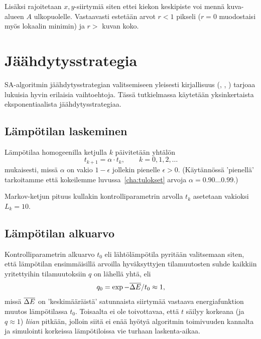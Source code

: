 Lisäksi rajoitetaan $x,y$-siirtymiä siten ettei kiekon keskipiste voi mennä kuva-alueen $A$ ulkopuolelle.
Vastaavasti estetään arvot $r < 1$ pikseli ($r = 0$ muodostaisi myös lokaalin minimin) ja $r >$ kuvan koko.


\section{Jäähdytysstrategia}
\label{sec:jaahdytysstrategia}


SA-algoritmin jäähdytysstrategian valitsemiseen yleisesti kirjallisuus (\cite{laarhoven}, \cite{salamonetal}, \cite{recipes07}) tarjoaa lukuisia hyvin erilaisia vaihtoehtoja.
Tässä tutkielmassa käytetään yksinkertaista eksponentiaalista jäähdytysstrategiaa.

\subsection{Lämpötilan laskeminen}
\label{sub:lampotilan_laskeminen}

Lämpötilaa homogeenilla ketjulla $k$ päivitetään yhtälön
\begin{equation}
    t_{k+1} = \alpha \cdot t_k, \qquad k = 0, 1, 2, \dots
\end{equation}
mukaisesti,
missä $\alpha$ on vakio $1 - \epsilon$ jollekin pienelle $\epsilon >0$.
(Käytännössä 'pienellä' tarkoitamme että kokeilemme luvussa~\ref{cha:tulokset} arvoja $\alpha = 0.90 \dots 0.99$.)

Markov-ketjun pituus kullakin kontrolliparametrin arvolla $t_k$ asetetaan vakioksi $L_k = 10$.


\subsection{Lämpötilan alkuarvo}
\label{sub:lampotilan_alkuarvo}

Kontrolliparametrin alkuarvo $t_0$ eli lähtölämpötila pyritään valitsemaan siten,
että lämpötilan ensimmäisillä arvoilla hyväksyttyjen tilamuutosten suhde kaikkiin yritettyihin  tilamuutoksiin  $q$ on lähellä yhtä, eli
\begin{equation}
    \label{eq:ratio}
    q_0 = \exp{-\overline{\Delta E} / t_0} \approx 1,
\end{equation}
missä $\overline{\Delta E}$ on 'keskimääräistä' satunnaista siirtymää vastaava energiafunktion muutos lämpötilassa $t_0$.
Toisaalta ei ole toivottavaa, että $t$ säilyy korkeana (ja $q \approx 1$) \emph{liian} pitkään, jolloin siitä ei enää hyötyä algoritmin toimivuuden kannalta ja simulointi korkeissa lämpötiloissa vie turhaan laskenta-aikaa.

